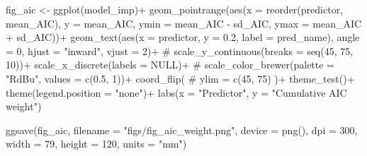 \documentclass[]{article}
\newenvironment{Shaded}{}{}
\newcommand{\CommentTok}[1]{\textcolor[rgb]{0.00,0.50,0.00}{#1}}
\newcommand{\DataTypeTok}[1]{#1}
\newcommand{\DecValTok}[1]{#1}
\newcommand{\FloatTok}[1]{#1}
\newcommand{\KeywordTok}[1]{\textcolor[rgb]{0.00,0.00,1.00}{#1}}
\newcommand{\NormalTok}[1]{#1}
\newcommand{\OperatorTok}[1]{#1}
\newcommand{\OtherTok}[1]{\textcolor[rgb]{1.00,0.25,0.00}{#1}}
\newcommand{\StringTok}[1]{\textcolor[rgb]{0.00,0.50,0.50}{#1}}
\begin{document}
\begin{Shaded}
\begin{Highlighting}[]
\NormalTok{fig_aic <-}
\StringTok{  }\KeywordTok{ggplot}\NormalTok{(model_imp)}\OperatorTok{+}
\StringTok{  }\KeywordTok{geom_pointrange}\NormalTok{(}\KeywordTok{aes}\NormalTok{(}\DataTypeTok{x =} \KeywordTok{reorder}\NormalTok{(predictor, mean_AIC),}
                      \DataTypeTok{y =}\NormalTok{ mean_AIC,}
                      \DataTypeTok{ymin =}\NormalTok{ mean_AIC }\OperatorTok{-}\StringTok{ }\NormalTok{sd_AIC,}
                      \DataTypeTok{ymax =}\NormalTok{ mean_AIC }\OperatorTok{+}\StringTok{ }\NormalTok{sd_AIC))}\OperatorTok{+}
\StringTok{  }\KeywordTok{geom_text}\NormalTok{(}\KeywordTok{aes}\NormalTok{(}\DataTypeTok{x =}\NormalTok{ predictor, }
                \DataTypeTok{y =} \FloatTok{0.2}\NormalTok{,}
                \DataTypeTok{label =}\NormalTok{ pred_name),}
            \DataTypeTok{angle =} \DecValTok{0}\NormalTok{,}
            \DataTypeTok{hjust =} \StringTok{"inward"}\NormalTok{,}
            \DataTypeTok{vjust =} \DecValTok{2}\NormalTok{)}\OperatorTok{+}
\StringTok{  }\CommentTok{# scale_y_continuous(breaks = seq(45, 75, 10))+}
\StringTok{  }\KeywordTok{scale_x_discrete}\NormalTok{(}\DataTypeTok{labels =} \OtherTok{NULL}\NormalTok{)}\OperatorTok{+}
\StringTok{  }\CommentTok{# scale_color_brewer(palette = "RdBu", values = c(0.5, 1))+}
\StringTok{  }\KeywordTok{coord_flip}\NormalTok{(}
    \CommentTok{# ylim = c(45, 75)}
\NormalTok{  )}\OperatorTok{+}
\StringTok{  }\KeywordTok{theme_test}\NormalTok{()}\OperatorTok{+}
\StringTok{  }\KeywordTok{theme}\NormalTok{(}\DataTypeTok{legend.position =} \StringTok{"none"}\NormalTok{)}\OperatorTok{+}
\StringTok{  }\KeywordTok{labs}\NormalTok{(}\DataTypeTok{x =} \StringTok{"Predictor"}\NormalTok{,}
       \DataTypeTok{y =} \StringTok{"Cumulative AIC weight"}\NormalTok{)}

\KeywordTok{ggsave}\NormalTok{(fig_aic,}
       \DataTypeTok{filename =} \StringTok{"figs/fig_aic_weight.png"}\NormalTok{, }
       \DataTypeTok{device =} \KeywordTok{png}\NormalTok{(),}
       \DataTypeTok{dpi =} \DecValTok{300}\NormalTok{,}
       \DataTypeTok{width =} \DecValTok{79}\NormalTok{, }\DataTypeTok{height =} \DecValTok{120}\NormalTok{, }\DataTypeTok{units =} \StringTok{"mm"}\NormalTok{)}
\end{Highlighting}
\end{Shaded}
\end{document}
